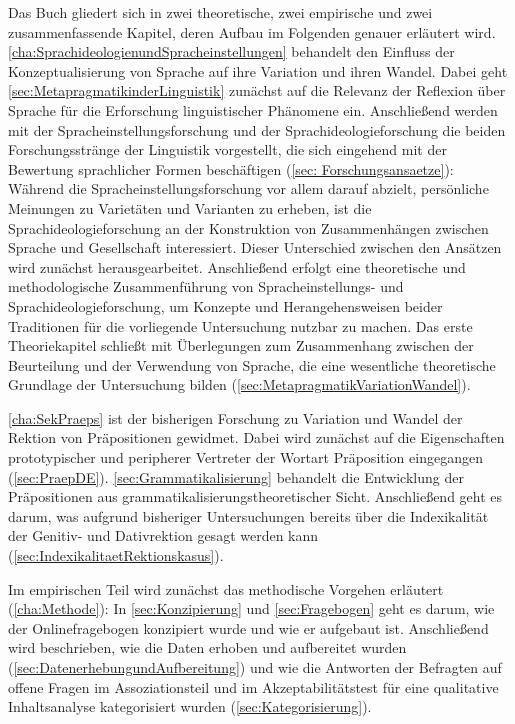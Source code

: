 Das Buch gliedert sich in zwei theoretische, zwei empirische und zwei zusammenfassende Kapitel, deren Aufbau im Folgenden genauer erläutert wird. 
\autoref{cha:SprachideologienundSpracheinstellungen} behandelt den Einfluss der Konzeptualisierung von Sprache auf ihre Variation und ihren Wandel. 
Dabei geht \autoref{sec:MetapragmatikinderLinguistik} zunächst auf die Relevanz der Reflexion über Sprache für die Erforschung linguistischer Phänomene ein. 
Anschließend werden mit der Spracheinstellungsforschung und der Sprachideologieforschung die beiden Forschungsstränge der Linguistik vorgestellt, die sich eingehend mit der Bewertung sprachlicher Formen beschäftigen (\autoref{sec: Forschungsansaetze}):   
Während die Spracheinstellungsforschung vor allem darauf abzielt, persönliche Meinungen zu Varietäten und Varianten zu erheben, ist die Sprachideologieforschung an der Konstruktion von Zusammenhängen zwischen Sprache und Gesellschaft interessiert. 
Dieser Unterschied zwischen den Ansätzen wird zunächst herausgearbeitet. 
Anschließend erfolgt eine theoretische und methodologische Zusammenführung von Spracheinstellungs- und Sprachideologieforschung, um Konzepte und Herangehensweisen beider Traditionen für die vorliegende Untersuchung nutzbar zu machen. 
Das erste Theoriekapitel schließt mit Überlegungen zum Zusammenhang zwischen der Beurteilung und der Verwendung von Sprache, die eine wesentliche theoretische Grundlage der Untersuchung bilden (\autoref{sec:MetapragmatikVariationWandel}). 

\autoref{cha:SekPraeps} ist der bisherigen Forschung zu Variation und Wandel der Rektion von Präpositionen gewidmet. 
Dabei wird zunächst auf die Eigenschaften prototypischer und peripherer Vertreter der Wortart Präposition eingegangen (\autoref{sec:PraepDE}).
\autoref{sec:Grammatikalisierung} behandelt die Entwicklung der Präpositionen aus grammatikalisierungstheoretischer Sicht. 
Anschließend geht es darum, was aufgrund bisheriger Untersuchungen bereits über die Indexikalität der Genitiv- und Dativrektion gesagt werden kann (\autoref{sec:IndexikalitaetRektionskasus}). 

Im empirischen Teil wird zunächst das methodische Vorgehen erläutert (\autoref{cha:Methode}): 
In \autoref{sec:Konzipierung} und \autoref{sec:Fragebogen} geht es darum, wie der Onlinefragebogen konzipiert wurde und wie er aufgebaut ist. 
Anschließend wird beschrieben, wie die Daten erhoben und aufbereitet wurden (\autoref{sec:DatenerhebungundAufbereitung}) und wie die Antworten der Befragten auf offene Fragen im Assoziationsteil und im Akzeptabilitätstest für eine qualitative Inhaltsanalyse kategorisiert wurden (\autoref{sec:Kategorisierung}). 

